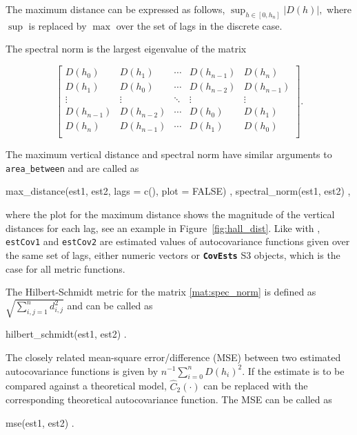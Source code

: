 The maximum distance can be expressed as follows, \( \sup_{h \in [0, h_{n}]} \left| D(h) \right| , \) where \(\sup\) is replaced by \(\max\) over the set of lags in the discrete case. 

The spectral norm is the largest eigenvalue of the matrix

\begin{equation}
\begin{bmatrix} \label{mat:spec_norm}
D(h_{0})     & D(h_{1})     & \cdots & D(h_{n - 1}) & D(h_{n})     \\
D(h_{1})     & D(h_{0})     & \cdots & D(h_{n - 2}) & D(h_{n - 1}) \\
\vdots       & \vdots       & \ddots & \vdots       & \vdots       \\
D(h_{n - 1}) & D(h_{n - 2}) & \cdots & D(h_{0})     & D(h_{1})     \\
D(h_{n})     & D(h_{n - 1}) & \cdots & D(h_{1})     & D(h_{0})     \\
\end{bmatrix}  .
\end{equation}

The maximum vertical distance and spectral norm have similar arguments to \texttt{area\_between} and are called as 
\begin{example}
max_distance(est1, est2, lags = c(), plot = FALSE) ,
spectral_norm(est1, est2) ,
\end{example}
where the plot for the maximum distance shows the magnitude of the vertical distances for each lag, see an example in Figure~\ref{fig:hall_dist}. Like with , \texttt{estCov1} and \texttt{estCov2} are estimated values of autocovariance functions given over the same set of lags, either numeric vectors or \textbf{\texttt{CovEsts}} S3 objects, which is the case for all metric functions.

The Hilbert-Schmidt metric for the matrix \eqref{mat:spec_norm} is defined as
\(
 \sqrt{\sum_{i,j= 1}^{n} d_{i,j}^{2}}
\) and can be called as
\begin{example}
hilbert_schmidt(est1, est2) .
\end{example}

The closely related mean-square error/difference (MSE) between two estimated autocovariance functions is given by
\(
n^{-1} \sum_{i = 0}^{n} D(h_{i})^{2} .
\)
If the estimate is to be compared against a theoretical model, \(\widehat{C}_{2}(\cdot)\) can be replaced with the corresponding theoretical autocovariance function.
The MSE can be called as 
\begin{example}
mse(est1, est2) .
\end{example}

